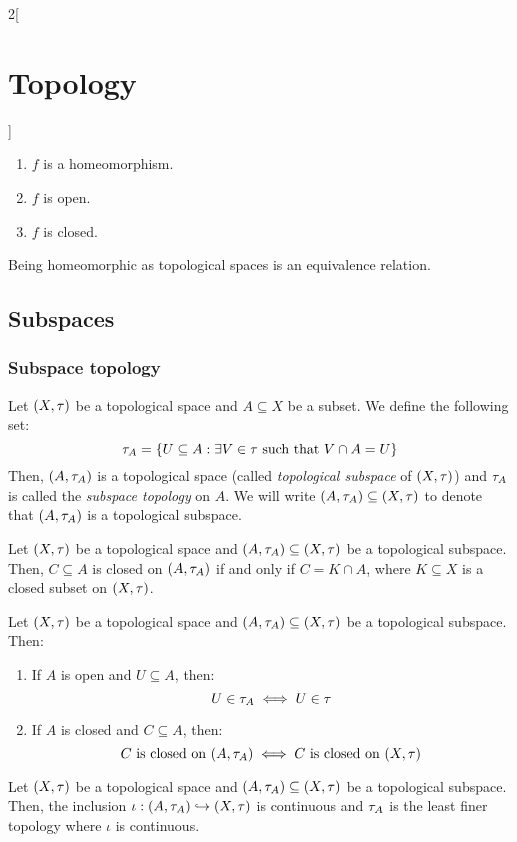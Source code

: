 \documentclass[../../../main_math.tex]{subfiles}
\begin{document}
\begin{multicols}{2}[\section{Topology}]
\begin{proposition}
    \begin{enumerate}
      \item $f$ is a homeomorphism.
      \item $f$ is open.
      \item $f$ is closed.
    \end{enumerate}
  \end{proposition}
  \begin{proposition}
    Being homeomorphic as topological spaces is an equivalence relation.
  \end{proposition}
  \subsection{Subspaces}
  \subsubsection{Subspace topology}
  \begin{definition}
    Let $(X,\tau)$ be a topological space and $A\subseteq X$ be a subset. We define the following set: $$\tau_A=\{U\subseteq A:\exists V\in\tau\text{ such that }V\cap A=U\}$$ Then, $(A,\tau_A)$ is a topological space (called \emph{topological subspace} of $(X,\tau)$) and $\tau_A$ is called the \emph{subspace topology} on $A$. We will write $(A,\tau_A)\subseteq (X,\tau)$ to denote that $(A,\tau_A)$ is a topological subspace.
  \end{definition}
  \begin{proposition}
    Let $(X,\tau)$ be a topological space and $(A,\tau_A)\subseteq (X,\tau)$ be a topological subspace. Then, $C\subseteq A$ is closed on $(A,\tau_A)$ if and only if $C=K\cap A$, where $K\subseteq X$ is a closed subset on $(X,\tau)$.
  \end{proposition}
  \begin{proposition}
    Let $(X,\tau)$ be a topological space and $(A,\tau_A)\subseteq (X,\tau)$ be a topological subspace. Then:
    \begin{enumerate}
      \item If $A$ is open and $U\subseteq A$, then: $$U\in\tau_A\iff U\in\tau$$
      \item If $A$ is closed and $C\subseteq A$, then: $$C\text{ is closed on }(A,\tau_A)\iff C\text{ is closed on }(X,\tau)$$
    \end{enumerate}
  \end{proposition}
  \begin{proposition}
    Let $(X,\tau)$ be a topological space and $(A,\tau_A)\subseteq (X,\tau)$ be a topological subspace. Then, the inclusion $\iota:(A,\tau_A)\hookrightarrow (X,\tau)$ is continuous and $\tau_A$ is the least finer topology where $\iota$ is continuous.

\end{proposition}
\end{multicols}
\end{document}
